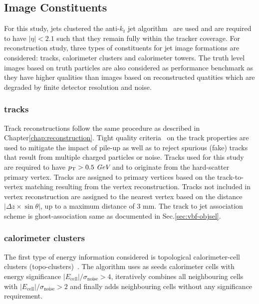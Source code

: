 \label{sec:cnn-image}
\subsection{Image Constituents}
For this study, jets clustered the anti-$k_t$ jet algorithm~\cite{Cacciari:2008gp}
are used and are required to have $|\eta|<2.1$ such that they remain fully within the
tracker coverage.
For reconstruction study, three types of constituents for jet image formations
are considered: tracks, calorimeter clusters and calorimeter towers. The truth level images
based on truth particles are also considered as performance benchmark as they have
higher qualities than images based on reconstructed quatities which are degraded by
finite detector resolution and noise. 

\subsubsection{tracks}
Track reconstructions follow the same procedure as described in Chapter\ref{chap:reconstruction}. Tight quality
criteria~\cite{ATL-PHYS-PUB-2015-051} on the track properties are used to mitigate the impact of pile-up as well as
to reject spurious (fake) tracks that result from multiple charged particles or noise.
Tracks used for this study are required to have $p_\text{T} > 0.5~\textit{GeV}$ and to originate from the hard-scatter primary vertex. 
Tracks are assigned to primary vertices based on the track-to-vertex matching resulting from the vertex reconstruction.
Tracks not included in vertex reconstruction are assigned to the nearest vertex based on the
distance $|\Delta z \times \sin\theta|$, up to a maximum distance of 3 mm.
The track to jet association scheme is ghost-association same as documented in Sec.\ref{sec:vbf-objsel}.


\subsubsection{calorimeter clusters}
The first type of energy information considered is topological calorimeter-cell 
clusters (topo-clusters)~\cite{PERF-2014-07}.
The algorithm uses as seeds calorimeter cells
with energy significance $|E_\text{cell}|/\sigma_\text{noise}>4$,
iteratively combines all neighbouring cells with
$|E_\text{cell}|/\sigma_\text{noise}>2$ and finally adds neighbouring cells
without any significance requirement.

